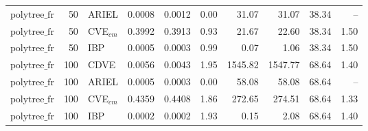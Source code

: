 \begin{table}[ht]
\begin{tabular}{lrlrrrrrrr}
$\text{polytree\_fr}$ & 50 & ARIEL & 0.0008 & 0.0012 & 0.00 & 31.07 & 31.07 & 38.34 & -- \\
$\text{polytree\_fr}$ & 50 & CVE$_{cm}$ & 0.3992 & 0.3913 & 0.93 & 21.67 & 22.60 & 38.34 & 1.50 \\
$\text{polytree\_fr}$ & 50 & IBP & 0.0005 & 0.0003 & 0.99 & 0.07 & 1.06 & 38.34 & 1.50 \\
\hline
$\text{polytree\_fr}$ & 100 & CDVE & 0.0056 & 0.0043 & 1.95 & 1545.82 & 1547.77 & 68.64 & 1.40 \\
$\text{polytree\_fr}$ & 100 & ARIEL & 0.0005 & 0.0003 & 0.00 & 58.08 & 58.08 & 68.64 & -- \\
$\text{polytree\_fr}$ & 100 & CVE$_{cm}$ & 0.4359 & 0.4408 & 1.86 & 272.65 & 274.51 & 68.64 & 1.33 \\
$\text{polytree\_fr}$ & 100 & IBP & 0.0002 & 0.0002 & 1.93 & 0.15 & 2.08 & 68.64 & 1.40 \\
\bottomrule
\end{tabular}
\end{table}

